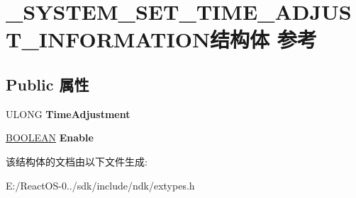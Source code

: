 \hypertarget{struct___s_y_s_t_e_m___s_e_t___t_i_m_e___a_d_j_u_s_t___i_n_f_o_r_m_a_t_i_o_n}{}\section{\+\_\+\+S\+Y\+S\+T\+E\+M\+\_\+\+S\+E\+T\+\_\+\+T\+I\+M\+E\+\_\+\+A\+D\+J\+U\+S\+T\+\_\+\+I\+N\+F\+O\+R\+M\+A\+T\+I\+O\+N结构体 参考}
\label{struct___s_y_s_t_e_m___s_e_t___t_i_m_e___a_d_j_u_s_t___i_n_f_o_r_m_a_t_i_o_n}
\subsection*{Public 属性}
\begin{DoxyCompactItemize}
\item 
\mbox{\label{struct___s_y_s_t_e_m___s_e_t___t_i_m_e___a_d_j_u_s_t___i_n_f_o_r_m_a_t_i_o_n_a12aa19cc0b33e8f6d803a9d5f82c707e}} 
U\+L\+O\+NG {\bfseries Time\+Adjustment}
\item 
\mbox{\label{struct___s_y_s_t_e_m___s_e_t___t_i_m_e___a_d_j_u_s_t___i_n_f_o_r_m_a_t_i_o_n_affce259b49a290c49db6d1effe2c43c8}} 
\hyperlink{_processor_bind_8h_a112e3146cb38b6ee95e64d85842e380a}{B\+O\+O\+L\+E\+AN} {\bfseries Enable}
\end{DoxyCompactItemize}


该结构体的文档由以下文件生成\+:\begin{DoxyCompactItemize}
\item 
E\+:/\+React\+O\+S-\/0../sdk/include/ndk/extypes.\+h\end{DoxyCompactItemize}
